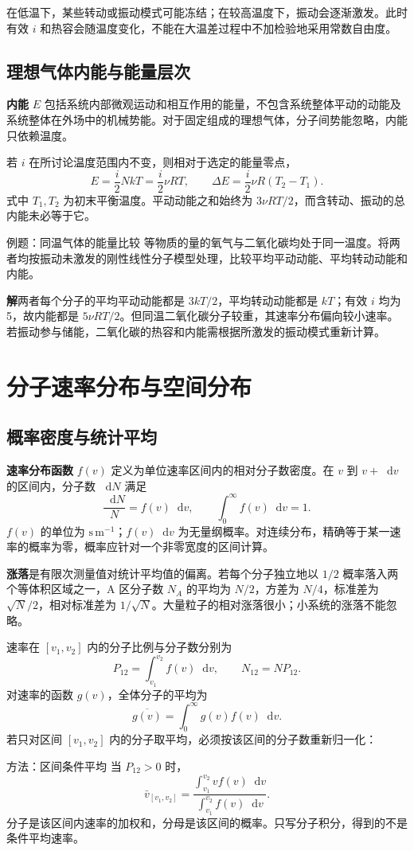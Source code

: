 \documentclass[UTF8,fontset=none,zihao=-4,a4paper]{ctexart}
\newcommand{\chapterpage}[1]{\clearpage\section{#1}}
\newcommand{\term}[1]{\textbf{#1}}
\newcommand{\dd}{\mathop{}\!\mathrm{d}}
\newcommand{\sol}{\par\noindent\textbf{解}\quad}
\begin{document}
在低温下，某些转动或振动模式可能冻结；在较高温度下，振动会逐渐激发。此时有效 $i$ 和热容会随温度变化，不能在大温差过程中不加检验地采用常数自由度。

\subsection{理想气体内能与能量层次}
\term{内能} $E$ 包括系统内部微观运动和相互作用的能量，不包含系统整体平动的动能及系统整体在外场中的机械势能。对于固定组成的理想气体，分子间势能忽略，内能只依赖温度。

若 $i$ 在所讨论温度范围内不变，则相对于选定的能量零点，
\[
 E=\frac i2NkT=\frac i2\nu RT,
 \qquad \Delta E=\frac i2\nu R(T_2-T_1).
\]
式中 $T_1,T_2$ 为初末平衡温度。平动动能之和始终为 $3\nu RT/2$，而含转动、振动的总内能未必等于它。

\begin{infobox}{例题：同温气体的能量比较}
等物质的量的氧气与二氧化碳均处于同一温度。将两者均按振动未激发的刚性线性分子模型处理，比较平均平动动能、平均转动动能和内能。
\end{infobox}
\sol 两者每个分子的平均平动动能都是 $3kT/2$，平均转动动能都是 $kT$；有效 $i$ 均为 5，故内能都是 $5\nu RT/2$。但同温二氧化碳分子较重，其速率分布偏向较小速率。若振动参与储能，二氧化碳的热容和内能需根据所激发的振动模式重新计算。

\chapterpage{分子速率分布与空间分布}
\subsection{概率密度与统计平均}
\term{速率分布函数} $f(v)$ 定义为单位速率区间内的相对分子数密度。在 $v$ 到 $v+\dd v$ 的区间内，分子数 $\dd N$ 满足
\[
 \frac{\dd N}{N}=f(v)\dd v,\qquad
 \int_0^\infty f(v)\dd v=1.
\]
$f(v)$ 的单位为 $\mathrm{s\,m^{-1}}$；$f(v)\dd v$ 为无量纲概率。对连续分布，精确等于某一速率的概率为零，概率应针对一个非零宽度的区间计算。

\term{涨落}是有限次测量值对统计平均值的偏离。若每个分子独立地以 $1/2$ 概率落入两个等体积区域之一，A 区分子数 $N_A$ 的平均为 $N/2$，方差为 $N/4$，标准差为 $\sqrt N/2$，相对标准差为 $1/\sqrt N$。大量粒子的相对涨落很小；小系统的涨落不能忽略。

速率在 $[v_1,v_2]$ 内的分子比例与分子数分别为
\[
 P_{12}=\int_{v_1}^{v_2}f(v)\dd v,
 \qquad N_{12}=NP_{12}.
\]
对速率的函数 $g(v)$，全体分子的平均为
\[
 \overline{g(v)}=\int_0^\infty g(v)f(v)\dd v.
\]
若只对区间 $[v_1,v_2]$ 内的分子取平均，必须按该区间的分子数重新归一化：
\begin{infobox}{方法：区间条件平均}
当 $P_{12}>0$ 时，
\[
 \bar v_{[v_1,v_2]}=
 \frac{\displaystyle\int_{v_1}^{v_2}vf(v)\dd v}
 {\displaystyle\int_{v_1}^{v_2}f(v)\dd v}.
\]
分子是该区间内速率的加权和，分母是该区间的概率。只写分子积分，得到的不是条件平均速率。
\end{infobox}
\end{document}
